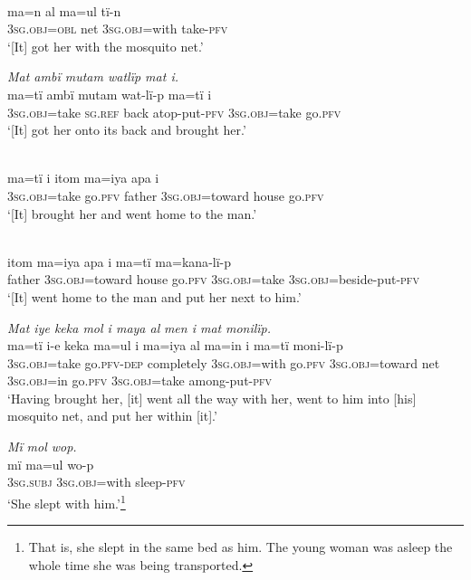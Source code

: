 \ex {}\\
\gll ma{=}n al  m{a=u}l      tï{{}-}n\\
3\textsc{sg.obj=obl}  net  3\textsc{sg.obj}=with  take-\textsc{pfv}\\
\glt ‘[It] got her with the mosquito net.’

\ex \negmedspace \textit{Mat amb}{\textit{ï mutam w}}\textit{atlïp mat i.}\\
\gll ma{=}tï      ambï  mutam  wat{{}-}l{ï-}p    ma{=}tï      i\\
3\textsc{sg.obj}=take  \textsc{sg.ref}  back  atop-put-\textsc{pfv}  3\textsc{sg.obj}=take  go.\textsc{pfv}\\
\glt ‘[It] got her onto its back and brought her.’

\ex {}\\
\gll ma{=}tï      i    itom  ma{=i}ya      apa    i\\
3\textsc{sg.obj}=take  go.\textsc{pfv}  father  3\textsc{sg.obj=}toward  house  go.\textsc{pfv}\\
\glt ‘[It] brought her and went home to the man.’

\ex {}\\
\gll itom  ma{=i}ya      apa    i    ma{=}tï m{a=}kana{{}-}l{ï-}p\\
father  3\textsc{sg.obj=}toward  house  go.\textsc{pfv}  3\textsc{sg.obj}=take 3\textsc{sg.obj}=beside-put-\textsc{pfv}\\
\glt ‘[It] went home to the man and put her next to him.’

\ex \negmedspace \textit{Mat iye keka mol i maya al} {\textit{men i mat}} \textit{mon}{\textit{i}}\textit{lïp.}\\
\gll ma{=}tï i-e        keka      ma={u}l       i ma{=i}ya      al  ma=in       i    ma=tï mon{i-}l{ï-}p\\
3\textsc{sg.obj}=take  go.\textsc{pfv-dep}  completely  3\textsc{sg.obj}=with  go.\textsc{pfv} 3\textsc{sg.obj=}toward  net  3\textsc{sg.obj=}in  go.\textsc{pfv}  \textsc{3sg.obj}=take  among-put-\textsc{pfv}\\
\glt ‘Having brought her, [it] went all the way with her, went to him into [his] mosquito net, and put her within [it].’

\ex \negmedspace \textit{M}{\textit{ï}} \textit{mol wop.}\\
\gll m{ï} m{a=u}l      wo-p\\
3\textsc{sg.subj}  3\textsc{sg.obj}=with  sleep-\textsc{pfv}\\
\glt ‘She slept with him.’\footnote{That is, she slept in the same bed as him. The young woman was asleep the whole time she was being transported.}

